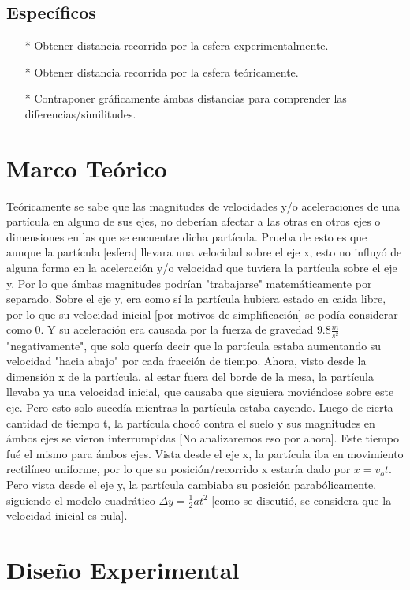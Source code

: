 \documentclass[osajnl,twocolumn,showpacs,superscriptaddress,10pt]{revtex4-1}
\begin{document}
\subsection{Específicos}
\begin{itemize}
\item[*] Obtener distancia recorrida por la esfera experimentalmente.
\item[*] Obtener distancia recorrida por la esfera teóricamente.
\item[*] Contraponer gráficamente ámbas distancias para comprender las diferencias/similitudes.
\end{itemize}
 
\section{Marco Teórico}
Teóricamente se sabe que las magnitudes de velocidades y/o aceleraciones de una partícula en alguno de sus ejes, no deberían afectar a las otras en otros ejes o dimensiones en las que se encuentre dicha partícula. Prueba de esto es que aunque la partícula [esfera] llevara una velocidad sobre el eje x, esto no influyó de alguna forma en la aceleración y/o velocidad que tuviera la partícula sobre el eje y. Por lo que ámbas magnitudes podrían "trabajarse" matemáticamente por separado. Sobre el eje y, era como sí la partícula hubiera estado en caída libre, por lo que su velocidad inicial [por motivos de simplificación] se podía considerar como 0. Y su aceleración era causada por la fuerza de gravedad $ 9.8 \frac{m}{s^2}$ "negativamente", que solo quería decir que la partícula estaba aumentando su velocidad "hacia abajo" por cada fracción de tiempo. Ahora, visto desde la dimensión x de la partícula, al estar fuera del borde de la mesa, la partícula llevaba ya una velocidad inicial, que causaba que siguiera moviéndose sobre este eje. Pero esto solo sucedía mientras la partícula estaba cayendo. Luego de cierta cantidad de tiempo t, la partícula chocó contra el suelo y sus magnitudes en ámbos ejes se vieron interrumpidas [No analizaremos eso por ahora]. Este tiempo fué el mismo para ámbos ejes. Vista desde el eje x, la partícula iba en movimiento rectilíneo uniforme, por lo que su posición/recorrido x estaría dado por $ x = v_ot$. Pero vista desde el eje y, la partícula cambiaba su posición parabólicamente, siguiendo el modelo cuadrático $ \Delta y = \frac{1}{2}at^2$ [como se discutió, se considera que la velocidad inicial es nula].

\section{Diseño Experimental}
\end{document}
